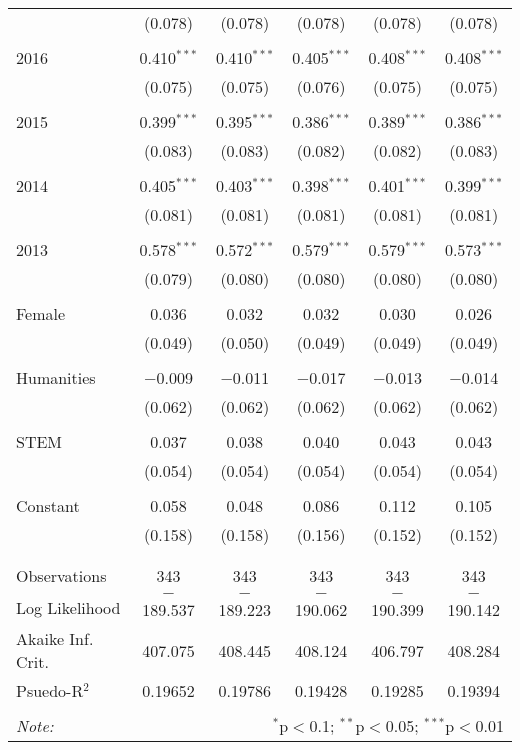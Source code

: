 \begin{table}[H]
\begin{adjustbox}{width=\textwidth, totalheight=\baselineskip}
\begin{tabular}{@{\extracolsep{5pt}}lccccc}
  & (0.078) & (0.078) & (0.078) & (0.078) & (0.078) \\ 
  & & & & & \\ 
 2016 & 0.410$^{***}$ & 0.410$^{***}$ & 0.405$^{***}$ & 0.408$^{***}$ & 0.408$^{***}$ \\ 
  & (0.075) & (0.075) & (0.076) & (0.075) & (0.075) \\ 
  & & & & & \\ 
 2015 & 0.399$^{***}$ & 0.395$^{***}$ & 0.386$^{***}$ & 0.389$^{***}$ & 0.386$^{***}$ \\ 
  & (0.083) & (0.083) & (0.082) & (0.082) & (0.083) \\ 
  & & & & & \\ 
 2014 & 0.405$^{***}$ & 0.403$^{***}$ & 0.398$^{***}$ & 0.401$^{***}$ & 0.399$^{***}$ \\ 
  & (0.081) & (0.081) & (0.081) & (0.081) & (0.081) \\ 
  & & & & & \\ 
 2013 & 0.578$^{***}$ & 0.572$^{***}$ & 0.579$^{***}$ & 0.579$^{***}$ & 0.573$^{***}$ \\ 
  & (0.079) & (0.080) & (0.080) & (0.080) & (0.080) \\ 
  & & & & & \\ 
 Female & 0.036 & 0.032 & 0.032 & 0.030 & 0.026 \\ 
  & (0.049) & (0.050) & (0.049) & (0.049) & (0.049) \\ 
  & & & & & \\ 
 Humanities & $-$0.009 & $-$0.011 & $-$0.017 & $-$0.013 & $-$0.014 \\ 
  & (0.062) & (0.062) & (0.062) & (0.062) & (0.062) \\ 
  & & & & & \\ 
 STEM & 0.037 & 0.038 & 0.040 & 0.043 & 0.043 \\ 
  & (0.054) & (0.054) & (0.054) & (0.054) & (0.054) \\ 
  & & & & & \\ 
 Constant & 0.058 & 0.048 & 0.086 & 0.112 & 0.105 \\ 
  & (0.158) & (0.158) & (0.156) & (0.152) & (0.152) \\ 
  & & & & & \\ 
\hline \\[-1.8ex] 
Observations & 343 & 343 & 343 & 343 & 343 \\ 
Log Likelihood & $-$189.537 & $-$189.223 & $-$190.062 & $-$190.399 & $-$190.142 \\ 
Akaike Inf. Crit. & 407.075 & 408.445 & 408.124 & 406.797 & 408.284 \\ 
Psuedo-R$^{2}$ & 0.19652 & 0.19786 & 0.19428 & 0.19285 & 0.19394 \\
\hline 
\hline \\[-1.8ex] 
\textit{Note:}  & \multicolumn{5}{r}{$^{*}$p$<$0.1; $^{**}$p$<$0.05; $^{***}$p$<$0.01} \\ 
\end{tabular} 
\end{adjustbox}
\end{table} 

